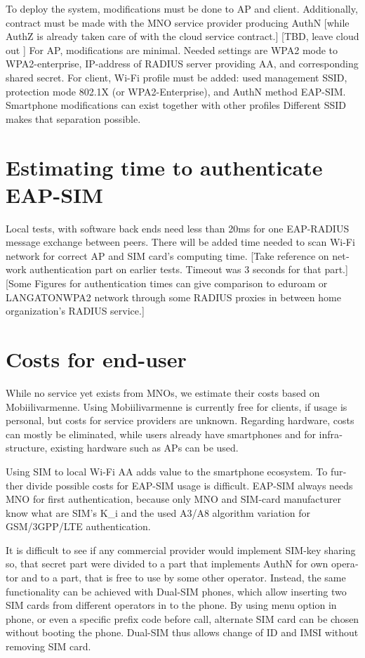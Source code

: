 \documentclass[12pt,a4paper,english]{tutthesis}
\begin{document}
\begin{otherlanguage}{english}
To deploy the system, modifications must be done to AP and client.
Additionally, contract must be made with the MNO service
provider producing AuthN [while AuthZ is already taken care of with
the cloud service contract.]  [TBD, leave cloud out ]
For AP, modifications are minimal. Needed settings are
WPA2 mode to WPA2-enterprise, IP-address of RADIUS server providing 
AA, and corresponding shared secret.
For client, Wi-Fi profile must be added: used management SSID,
protection mode 802.1X (or WPA2-Enterprise), and AuthN method EAP-SIM.
Smartphone modifications can exist together with other
profiles  Different SSID makes that separation possible.

\section{Estimating time to authenticate EAP-SIM}
\label{sec-6-2}
Local tests, with software back ends need less than 20ms for one EAP-RADIUS message
exchange between peers. There will be added time needed to scan Wi-Fi
network for correct AP and SIM card's computing
time.
 [Take reference on network authentication part on earlier
tests. Timeout was 3 seconds for that part.]
[Some Figures for authentication times can give comparison to eduroam
or LANGATONWPA2 network through some RADIUS proxies in between home
organization's RADIUS service.]

\section{Costs for end-user}
\label{sec-6-3}
While no service yet exists from MNOs, we estimate their costs based on
Mobiilivarmenne. Using Mobiilivarmenne 
is currently free for clients, if usage is personal, but costs
for service providers are unknown. 
Regarding hardware, costs can mostly be eliminated, while users
already have smartphones and for infrastructure, existing hardware
such as APs can be used.

Using SIM to local Wi-Fi AA adds value to the smartphone ecosystem.
To further divide possible costs for EAP-SIM usage
is difficult.
EAP-SIM always needs MNO for first authentication,
because only MNO and SIM-card manufacturer know 
what are SIM's K\_i and the used A3/A8 algorithm variation
for GSM/3GPP/LTE authentication.

It is difficult to see if any commercial provider would implement
SIM-key sharing so, that secret part were divided to a part that
implements AuthN for own operator and to a part, that is free to use by
some other operator.  Instead, the same functionality can be achieved with
Dual-SIM phones, which allow inserting two SIM cards from different
operators in to the phone. By using menu option in phone, or even a
specific prefix code before call, alternate SIM card can be chosen
without booting the phone.
Dual-SIM thus allows change of ID and IMSI without removing SIM card.


\end{otherlanguage}
\end{document}

